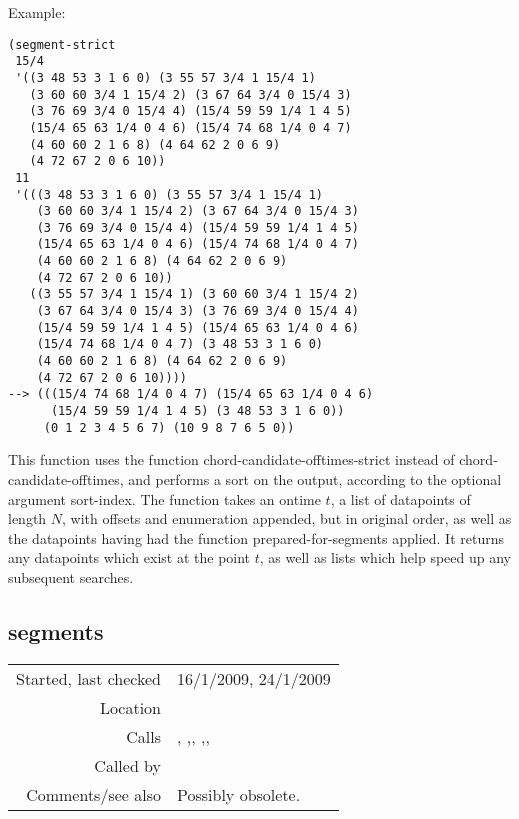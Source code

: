 \vspace{0.5cm}
\noindent Example:
\begin{verbatim}
(segment-strict
 15/4
 '((3 48 53 3 1 6 0) (3 55 57 3/4 1 15/4 1)
   (3 60 60 3/4 1 15/4 2) (3 67 64 3/4 0 15/4 3)
   (3 76 69 3/4 0 15/4 4) (15/4 59 59 1/4 1 4 5)
   (15/4 65 63 1/4 0 4 6) (15/4 74 68 1/4 0 4 7)
   (4 60 60 2 1 6 8) (4 64 62 2 0 6 9)
   (4 72 67 2 0 6 10))
 11
 '(((3 48 53 3 1 6 0) (3 55 57 3/4 1 15/4 1)
    (3 60 60 3/4 1 15/4 2) (3 67 64 3/4 0 15/4 3)
    (3 76 69 3/4 0 15/4 4) (15/4 59 59 1/4 1 4 5)
    (15/4 65 63 1/4 0 4 6) (15/4 74 68 1/4 0 4 7)
    (4 60 60 2 1 6 8) (4 64 62 2 0 6 9)
    (4 72 67 2 0 6 10))
   ((3 55 57 3/4 1 15/4 1) (3 60 60 3/4 1 15/4 2)
    (3 67 64 3/4 0 15/4 3) (3 76 69 3/4 0 15/4 4)
    (15/4 59 59 1/4 1 4 5) (15/4 65 63 1/4 0 4 6)
    (15/4 74 68 1/4 0 4 7) (3 48 53 3 1 6 0)
    (4 60 60 2 1 6 8) (4 64 62 2 0 6 9)
    (4 72 67 2 0 6 10))))
--> (((15/4 74 68 1/4 0 4 7) (15/4 65 63 1/4 0 4 6)
      (15/4 59 59 1/4 1 4 5) (3 48 53 3 1 6 0))
     (0 1 2 3 4 5 6 7) (10 9 8 7 6 5 0))
\end{verbatim}

\noindent This function uses the function
chord-candidate-offtimes-strict instead of
chord-candidate-offtimes, and performs a sort on the
output, according to the optional argument sort-index.
The function takes an ontime $t$, a list of datapoints
of length $N$, with offsets and enumeration appended,
but in original order, as well as the datapoints
having had the function prepared-for-segments applied.
It returns any datapoints which exist at the point
$t$, as well as lists which help speed up any
subsequent searches.


\subsection*{segments}\label{fun:segments}

\vspace{0.3cm}
\begin{tabular}{r|p{8cm}}
Started, last checked & 16/1/2009, 24/1/2009 \\
Location & \nameref{sec:segmentation} \\
Calls & \nameref{fun:add-to-list}, \nameref{fun:append-offtimes},\newline \nameref{fun:enumerate-append}, \nameref{fun:first-n-naturals},\newline \nameref{fun:nth-list-of-lists}, \nameref{fun:prepare-for-segments} \\
Called by & \\
Comments/see also & Possibly obsolete.
\end{tabular}

